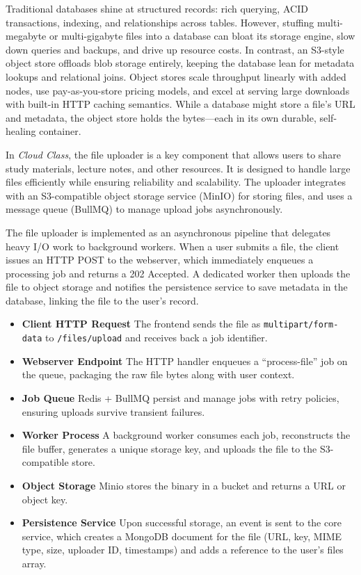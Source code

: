 Traditional databases shine at structured records: rich querying, ACID transactions, indexing, and relationships across tables. However, stuffing multi-megabyte or multi-gigabyte files into a database can bloat its storage engine, slow down queries and backups, and drive up resource costs. In contrast, an S3-style object store offloads blob storage entirely, keeping the database lean for metadata lookups and relational joins. Object stores scale throughput linearly with added nodes, use pay-as-you-store pricing models, and excel at serving large downloads with built-in HTTP caching semantics. While a database might store a file’s URL and metadata, the object store holds the bytes—each in its own durable, self-healing container.

In \emph{Cloud Class}, the file uploader is a key component that allows users to share study materials, lecture notes, and other resources. It is designed to handle large files efficiently while ensuring reliability and scalability. The uploader integrates with an S3-compatible object storage service (MinIO) for storing files, and uses a message queue (BullMQ) to manage upload jobs asynchronously.

The file uploader is implemented as an asynchronous pipeline that delegates heavy I/O work to background workers. When a user submits a file, the client issues an HTTP POST to the webserver, which immediately enqueues a processing job and returns a 202 Accepted. A dedicated worker then uploads the file to object storage and notifies the persistence service to save metadata in the database, linking the file to the user’s record.

\begin{itemize}
\item \textbf{Client HTTP Request}
The frontend sends the file as \texttt{multipart/form-data} to \texttt{/files/upload} and receives back a job identifier.
\item \textbf{Webserver Endpoint}
The HTTP handler enqueues a “process-file” job on the queue, packaging the raw file bytes along with user context.
\item \textbf{Job Queue}
Redis + BullMQ persist and manage jobs with retry policies, ensuring uploads survive transient failures.
\item \textbf{Worker Process}
A background worker consumes each job, reconstructs the file buffer, generates a unique storage key, and uploads the file to the S3-compatible store.
\item \textbf{Object Storage}
Minio stores the binary in a bucket and returns a URL or object key.
\item \textbf{Persistence Service}
Upon successful storage, an event is sent to the core service, which creates a MongoDB document for the file (URL, key, MIME type, size, uploader ID, timestamps) and adds a reference to the user’s files array.
\end{itemize}

